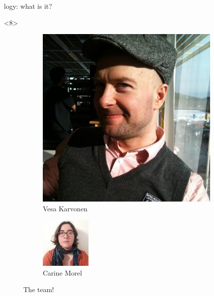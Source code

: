 \begin{frame}[fragile]{\Zoo[]logy: what is it?}
\begin{adjustwidth}{-1em}{-1em}
\begin{overbox}<8>
    \begin{figure}
        \begin{subfigure}{0.4\textwidth}
            \includegraphics[scale=0.2]{images/vesa_karvonen.jpg}
            \caption*{\footnotesize Vesa Karvonen}
        \end{subfigure}
        \begin{subfigure}{0.4\textwidth}
            \includegraphics[scale=1]{images/carine_morel.jpg}
            \caption*{\footnotesize Carine Morel}
        \end{subfigure}
        \caption*{The \Saturn team!}
    \end{figure}
\end{overbox}


\end{adjustwidth}
\end{frame}
